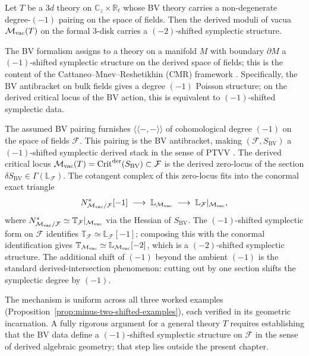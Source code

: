 \begin{conjecture}
\label{conj:minus-two-shifted-general}
Let $T$ be a $3d$ theory on $\mathbb{C}_z \times \mathbb{R}_t$ whose
BV theory carries a non-degenerate degree-$(-1)$ pairing on the space
of fields. Then the derived moduli of vacua
$\mathcal M_{\mathrm{vac}}(T)$ on the formal $3$-disk carries a
$(-2)$-shifted symplectic structure.
\end{conjecture}

\begin{remark}
The BV formalism assigns to a theory on a manifold $M$ with boundary
$\partial M$ a $(-1)$-shifted symplectic structure on the derived
space of fields; this is the content of the
Cattaneo--Mnev--Reshetikhin (CMR) framework \cite{CMR14}.
Specifically, the BV antibracket on bulk fields gives a degree
$(-1)$ Poisson structure; on the derived critical locus of the BV
action, this is equivalent to $(-1)$-shifted symplectic data.

The assumed BV pairing furnishes
$\langle\!\langle -,- \rangle\!\rangle$ of cohomological degree
$(-1)$ on the space of fields $\mathcal{F}$. This pairing is the
BV antibracket, making $(\mathcal{F}, S_{\mathrm{BV}})$ a
$(-1)$-shifted symplectic derived stack in the sense of
PTVV \cite{PTVV13}. The derived critical locus
$\mathcal M_{\mathrm{vac}}(T) =
\operatorname{Crit}^{\mathrm{der}}(S_{\mathrm{BV}}) \subset
\mathcal{F}$ is the derived zero-locus of the section
$\delta S_{\mathrm{BV}} \in \Gamma(\mathbb{L}_{\mathcal{F}})$.
The cotangent complex of this zero-locus fits into the
conormal exact triangle
\[
 N^*_{\mathcal M_{\mathrm{vac}}/\mathcal{F}}[-1]
 \;\longrightarrow\;
 \mathbb{L}_{\mathcal M_{\mathrm{vac}}}
 \;\longrightarrow\;
 \mathbb{L}_{\mathcal{F}}|_{\mathcal M_{\mathrm{vac}}},
\]
where $N^*_{\mathcal M_{\mathrm{vac}}/\mathcal{F}} \simeq
\mathbb{T}_{\mathcal{F}}|_{\mathcal M_{\mathrm{vac}}}$ via the Hessian
of $S_{\mathrm{BV}}$. The $(-1)$-shifted symplectic form on
$\mathcal{F}$ identifies
$\mathbb{T}_{\mathcal{F}} \simeq \mathbb{L}_{\mathcal{F}}[-1]$;
composing this with the conormal identification gives
$\mathbb{T}_{\mathcal M_{\mathrm{vac}}} \simeq
\mathbb{L}_{\mathcal M_{\mathrm{vac}}}[-2]$, which is a $(-2)$-shifted
symplectic structure. The additional shift of $(-1)$ beyond the
ambient $(-1)$ is the standard derived-intersection phenomenon:
cutting out by one section shifts the symplectic degree by $(-1)$.

The mechanism is uniform across all three worked examples
(Proposition~\ref{prop:minus-two-shifted-examples}), each verified
in its geometric incarnation. A fully rigorous argument for a general
theory $T$ requires establishing that the BV data define a
$(-1)$-shifted symplectic structure on $\mathcal{F}$ in the sense of
derived algebraic geometry; that step lies outside the present
chapter.
\end{remark}

